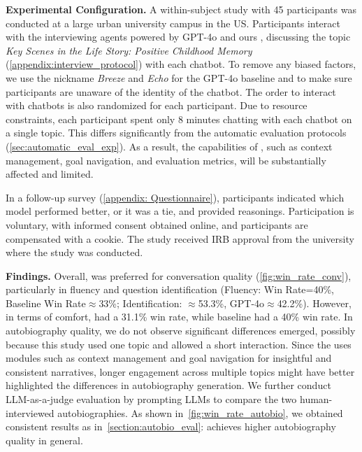 \textbf{Experimental Configuration.}
A within-subject study with 45 participants was conducted at a large urban university campus in the US. Participants interact with the interviewing agents powered by GPT-4o and ours \methodname, discussing the topic \textit{Key Scenes in the Life Story: Positive Childhood Memory} (\cref{appendix:interview_protocol}) with each chatbot. To remove any biased factors, we use the nickname \textit{Breeze} and \textit{Echo} for the GPT-4o baseline and \methodname to make sure participants are unaware of the identity of the chatbot. The order to interact with chatbots is also randomized for each participant. Due to resource constraints, each participant spent only 8 minutes chatting with each chatbot on a single topic. This differs significantly from the automatic evaluation protocols (\cref{sec:automatic_eval_exp}). As a result, the capabilities of \methodname, such as context management, goal navigation, and evaluation metrics, will be substantially affected and limited. 

In a follow-up survey (\cref{appendix: Questionnaire}), participants indicated which model performed better, or it was a tie, and provided reasonings. 
Participation is voluntary, with informed consent obtained online, and participants are compensated with a cookie. The study received IRB approval from the university where the study was conducted.

\noindent\textbf{Findings.}
Overall, \methodname was preferred for conversation quality (\cref{fig:win_rate_conv}), particularly in fluency and question identification (Fluency: \methodname Win Rate=40\%, Baseline Win Rate$\approx$33\%; Identification: \methodname$\approx$53.3\%, GPT-4o$\approx$42.2\%). However, in terms of comfort, \methodname had a 31.1\% win rate, while baseline had a 40\% win rate. In autobiography quality, we do not observe significant differences emerged, possibly because this study used one topic and allowed a short interaction. Since the \methodname uses modules such as context management and goal navigation for insightful and consistent narratives, longer engagement across multiple topics might have better highlighted the differences in autobiography generation. We further conduct LLM-as-a-judge evaluation by prompting LLMs to compare the two human-interviewed autobiographies. As shown in~\cref{fig:win_rate_autobio}, we obtained consistent results as in~\cref{section:autobio_eval}: \methodname achieves higher autobiography quality in general.

